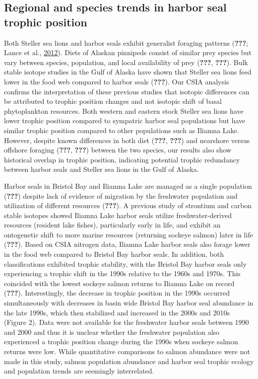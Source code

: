 \documentclass [11pt, proquest] {uwthesis}[2015/03/03]
\begin{document}
\subsection{Regional and species trends in harbor seal trophic
position}\label{regional-and-species-trends-in-harbor-seal-trophic-position}

Both Steller sea lions and harbor seals exhibit generalist foraging
patterns ({\textbf{???}}; Lance et al.,
\protect\hyperlink{ref-Lance2012}{2012}). Diets of Alaskan pinnipeds
consist of similar prey species but vary between species, population,
and local availability of prey ({\textbf{???}}, {\textbf{???}}). Bulk
stable isotope studies in the Gulf of Alaska have shown that Steller sea
lions feed lower in the food web compared to harbor seals
({\textbf{???}}). Our CSIA analysis confirms the interpretation of these
previous studies that isotopic differences can be attributed to trophic
position changes and not isotopic shift of basal phytoplankton
resources. Both western and eastern stock Steller sea lions have lower
trophic position compared to sympatric harbor seal populations but have
similar trophic position compared to other populations such as Iliamna
Lake. However, despite known differences in both diet ({\textbf{???}},
{\textbf{???}}) and nearshore versus offshore foraging ({\textbf{???}},
{\textbf{???}}) between the two species, our results also show
historical overlap in trophic position, indicating potential trophic
redundancy between harbor seals and Steller sea lions in the Gulf of
Alaska.

Harbor seals in Bristol Bay and Iliamna Lake are managed as a single
population ({\textbf{???}}) despite lack of evidence of migration by the
freshwater population and utilization of different resources
({\textbf{???}}). A previous study of strontium and carbon stable
isotopes showed Iliamna Lake harbor seals utilize freshwater-derived
resources (resident lake fishes), particularly early in life, and
exhibit an ontogenetic shift to more marine resources (returning sockeye
salmon) later in life ({\textbf{???}}). Based on CSIA nitrogen data,
Iliamna Lake harbor seals also forage lower in the food web compared to
Bristol Bay harbor seals. In addition, both classifications exhibited
trophic stability, with the Bristol Bay harbor seals only experiencing a
trophic shift in the 1990s relative to the 1960s and 1970s. This
coincided with the lowest sockeye salmon returns to Iliamna Lake on
record ({\textbf{???}}). Interestingly, the decrease in trophic position
in the 1990s occurred simultaneously with decreases in basin wide
Bristol Bay harbor seal abundance in the late 1990s, which then
stabilized and increased in the 2000s and 2010s (Figure 2). Data were
not available for the freshwater harbor seals between 1990 and 2000 and
thus it is unclear whether the freshwater population also experienced a
trophic position change during the 1990s when sockeye salmon returns
were low. While quantitative comparisons to salmon abundance were not
made in this study, salmon population abundance and harbor seal trophic
ecology and population trends are seemingly interrelated.
\end{document}

